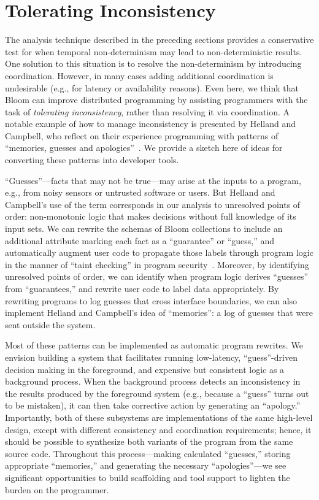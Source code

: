 \section{Tolerating Inconsistency}
\label{sec:inconsistency}
The analysis technique described in the preceding sections provides a
conservative test for when temporal non-determinism may lead to
non-deterministic results. One solution to this situation is to resolve the
non-determinism by introducing coordination. However, in many cases adding
additional coordination is undesirable (e.g., for latency or availability
reasons). Even here, we think that Bloom can improve distributed programming by
assisting programmers with the task of \emph{tolerating inconsistency}, rather
than resolving it via coordination.  A notable example of how to manage
inconsistency is presented by Helland and Campbell, who reflect on their
experience programming with patterns of ``memories, guesses and
apologies''~\cite{quicksand}.  We provide a sketch here of ideas for converting
these patterns into developer tools.

``Guesses''---facts that may not be true---may arise at the inputs to a program,
e.g., from noisy sensors or untrusted software or users.  But Helland and
Campbell's use of the term corresponds in our analysis to unresolved points of
order: non-monotonic logic that makes decisions without full knowledge of its
input sets.  We can rewrite the schemas of Bloom collections to include an
additional attribute marking each fact as a ``guarantee'' or ``guess,'' and
automatically augment user code to propagate those labels through program logic
in the manner of ``taint checking'' in program security~\cite{taint,asbestos}.
Moreover, by identifying unresolved points of order, we can identify when
program logic derives ``guesses'' from ``guarantees,'' and rewrite user code to
label data appropriately. By rewriting programs to log guesses that cross
interface boundaries, we can also implement Helland and Campbell's idea of
``memories'': a log of guesses that were sent outside the system.

Most of these patterns can be implemented as automatic program rewrites. We
envision building a system that facilitates running low-latency,
``guess''-driven decision making in the foreground, and expensive but consistent
logic as a background process. When the background process detects an
inconsistency in the results produced by the foreground system (e.g., because a
``guess'' turns out to be mistaken), it can then take corrective action by
generating an ``apology.'' Importantly, both of these subsystems are
implementations of the same high-level design, except with different consistency
and coordination requirements; hence, it should be possible to synthesize both
variants of the program from the same source code. Throughout this
process---making calculated ``guesses,'' storing appropriate ``memories,'' and
generating the necessary ``apologies''---we see significant opportunities to
build scaffolding and tool support to lighten the burden on the programmer.

